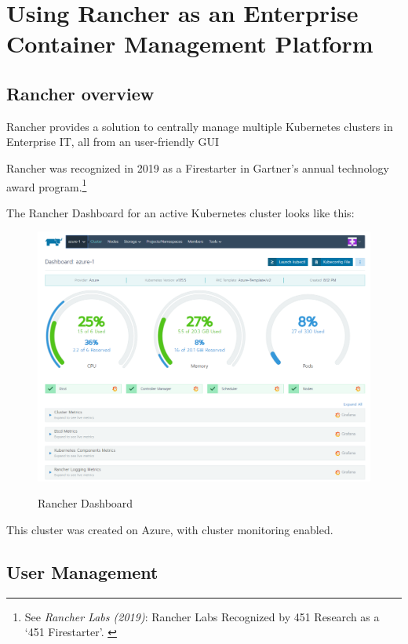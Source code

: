 %
%

\pagebreak
\section{Using Rancher as an Enterprise Container Management Platform}

\onehalfspacing

\subsection{Rancher overview}

Rancher provides a solution to centrally manage multiple Kubernetes clusters in Enterprise IT, all from an user-friendly GUI

Rancher was recognized in 2019 as a Firestarter in Gartner's annual technology award program.\footnote{See \textit{Rancher Labs (2019)}: Rancher Labs Recognized by 451 Research as a ‘451 Firestarter’. \cite{firestarter451}}

The Rancher Dashboard for an active Kubernetes cluster looks like this:

\begin{figure}[h]
\centering
\caption {Rancher Dashboard}
\includegraphics[width=\linewidth]{images/dashboard}
\label{fig:rancherDashboard}
\end{figure}

This cluster was created on Azure, with cluster monitoring enabled.

\subsection{User Management}

